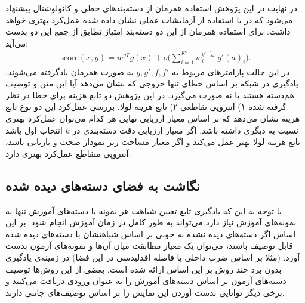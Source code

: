   در نهایت در این پژوهش استفاده همزمان از دسته‌بندهای خطی و کانولوشنال پیشنهاد می‌شود که در با استفاده از آزمایشات عملی نشان داده شده عمل‌کرد بهتری خواهد داشت. برای استفاده همزمان از این دو دسته‌بند امتیاز تطابق از جمع این دو بدست می‌آید:
\begin{align}
\text{score}(x,y)=w^{yT}g(x) + o\bigg(\sum_{i=1}^{K'}w^{y'}_{i}\  \check{*} \  g'(a)_i\bigg).
\end{align}
در این حالت پارامترهای مربوط به $g, g', f , f'$ به صورت همزمان یادگرفته می‌شوند.
یادگیری در شبکه بر اساس خطای تنها خروجی که نشان می‌دهد آیا این متن و توصیف هم‌دسته هستند یا نه صورت می‌گیرد. در این پژوهش دو تابع هزینه برای خطا در نظر گرفته شده ۱) آنتروپی تقاطعی
۲) تابع هزینه لولا. بررسی عمل‌کرد این دو نوع تابع هزینه نشان می‌دهد که بر اساس معیار ارزیابی نهایی هر کدام می‌توان عمل‌کرد بهتری نسبت به دیگری داشته باشد. اگر معیار ارزیابی دقت دسته‌بندی در $k$ انتخاب اول باشد تابع هزینه لولا بهتر عمل می‌کند و اگر معیار مساحت زیر نمودار صحت و بازیابی باشد، آنتروپی متقاطع عمل‌کرد بهتری دارد.

\subsection{نگاشت به فضای دسته‌های دیده شده}
با توجه به این که یادگیری تابع تعیین شباهت هر نمونه با دسته‌های آموزش تنها به نمونه‌های آموزش نیاز دارد می‌تواند به طور کامل در زمان آموزش انجام شود. بر این اساس اگر دسته‌های دیده نشده به خوبی بر اساس شباهتشان با دسته‌های دیده شده قابل توصیف باشند، می‌توان یک معیار مطابقت میان آن‌ها و نمونه‌های آزمون بدست آورد. (مثلا بر اساس ضرب داخلی یا فاصله اقدلیدسی در این فضا) در زمینه‌ی یادگیری بدون برد چند روش بر این اساس ارائه شده است. بعضی از این روش‌ها توصیف دسته‌های آزمون بر اساس دسته‌های آموزش را به عنوان ورودی دریافت می‌کنند و برخی دیگر توانایی بدست آوردن این نمایش را بر اساس توصیف‌های جانبی دارند. 


 


